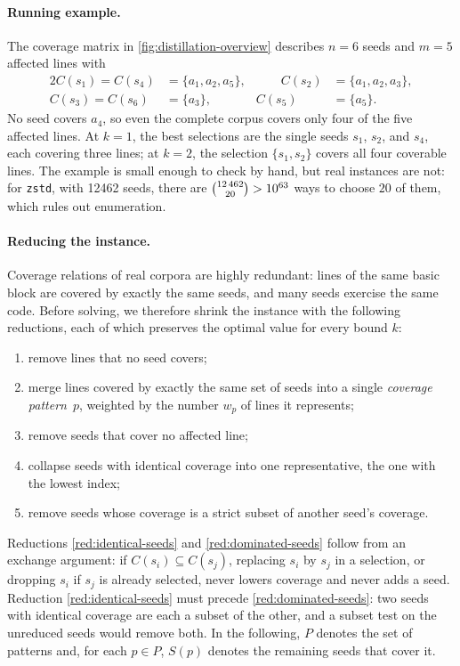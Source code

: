 \paragraph{Running example.}
The coverage matrix in \cref{fig:distillation-overview} describes $n=6$ seeds and $m=5$ affected lines with
\begin{alignat*}{2}
  C(s_1) = C(s_4) &= \{a_1, a_2, a_5\}, &\qquad C(s_2) &= \{a_1, a_2, a_3\}, \\
  C(s_3) = C(s_6) &= \{a_3\},           &       C(s_5) &= \{a_5\}.
\end{alignat*}
No seed covers $a_4$, so even the complete corpus covers only four of the five affected lines.
At $k=1$, the best selections are the single seeds $s_1$, $s_2$, and $s_4$, each covering three lines; at $k=2$, the selection $\{s_1, s_2\}$ covers all four coverable lines.
The example is small enough to check by hand, but real instances are not: for \texttt{zstd}, with \num{12462} seeds, there are $\tbinom{\num{12462}}{20} > \num{e63}$ ways to choose $20$ of them, which rules out enumeration.

\paragraph{Reducing the instance.}
Coverage relations of real corpora are highly redundant: lines of the same basic block are covered by exactly the same seeds, and many seeds exercise the same code.
Before solving, we therefore shrink the instance with the following reductions, each of which preserves the optimal value for every bound $k$:
\begin{enumerate}[label=(\roman*), ref=(\roman*), nosep, widest=iii]
  \item\label{red:uncovered-lines} remove lines that no seed covers;
  \item\label{red:patterns} merge lines covered by exactly the same set of seeds into a single \emph{coverage pattern}~$p$, weighted by the number $w_p$ of lines it represents;
  \item\label{red:empty-seeds} remove seeds that cover no affected line;
  \item\label{red:identical-seeds} collapse seeds with identical coverage into one representative, the one with the lowest index;
  \item\label{red:dominated-seeds} remove seeds whose coverage is a strict subset of another seed's coverage.
\end{enumerate}
Reductions \ref{red:identical-seeds} and \ref{red:dominated-seeds} follow from an exchange argument: if $C(s_i)\subseteq C(s_j)$, replacing $s_i$ by $s_j$ in a selection, or dropping $s_i$ if $s_j$ is already selected, never lowers coverage and never adds a seed.
Reduction \ref{red:identical-seeds} must precede \ref{red:dominated-seeds}: two seeds with identical coverage are each a subset of the other, and a subset test on the unreduced seeds would remove both.
In the following, $P$ denotes the set of patterns and, for each $p\in P$, $S(p)$ denotes the remaining seeds that cover it.

